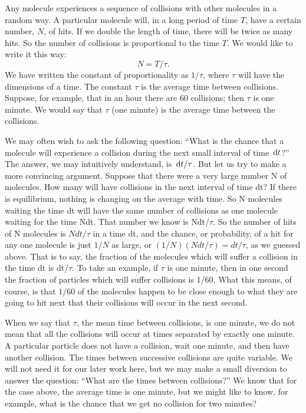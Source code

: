 \begin{subappendices}
Any molecule experiences a sequence of collisions with other molecules in a random way. A particular molecule will, in a long period of time $T$, have a certain number, $N$, of hits. If we double the length of time, there will be twice as many hits. So the number of collisions is proportional to the time $T$. We would like to write it this way:
\begin{equation} \label{Q:rates-time}
  N = T/\tau.
\end{equation}
%
We have written the constant of proportionality as $1/\tau$, where $\tau$ will have the dimensions of a time. The constant $\tau$ is the average time between collisions. Suppose, for example, that in an hour there are 60 collisions; then $\tau$ is one minute. We would say that $\tau$ (one minute) is the average time between the collisions.

We may often wish to ask the following question: ``What is the chance that a molecule will experience a collision during the next small interval of time $\,\mathrm{d} t$?'' The answer, we may intuitively understand, is $\,\mathrm{d} t/\tau$. But let us try to make a more convincing argument. Suppose that there were a very large number N of molecules. How many will have collisions in the next interval of time dt? If there is equilibrium, nothing is changing on the average with time. So N molecules waiting the time dt will have the same number of collisions as one molecule waiting for the time Ndt. That number we know is Ndt/$\tau$. So the number of hits of N molecules is $Ndt/\tau$ in a time dt, and the chance, or probability, of a hit for any one molecule is just $1/N$ as large, or $(1/N)(Ndt/\tau)=dt/\tau$, as we guessed above. That is to say, the fraction of the molecules which will suffer a collision in the time dt is dt/$\tau$. To take an example, if $\tau$ is one minute, then in one second the fraction of particles which will suffer collisions is 1/60. What this means, of course, is that $1/60$ of the molecules happen to be close enough to what they are going to hit next that their collisions will occur in the next second.

When we say that $\tau$, the mean time between collisions, is one minute, we do not mean that all the collisions will occur at times separated by exactly one minute. A particular particle does not have a collision, wait one minute, and then have another collision. The times between successive collisions are quite variable. We will not need it for our later work here, but we may make a small diversion to answer the question: ``What are the times between collisions?'' We know that for the case above, the average time is one minute, but we might like to know, for example, what is the chance that we get no collision for two minutes?


\end{subappendices}
